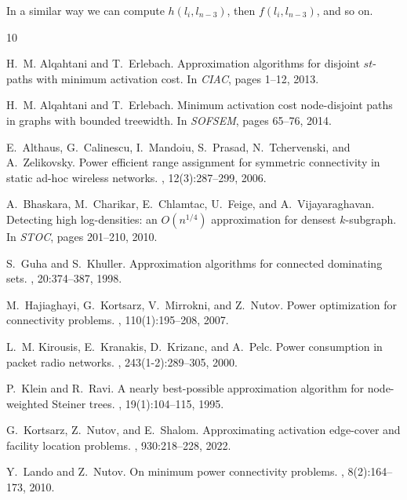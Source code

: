 \documentclass[a4paper,UKenglish,autoref]{lipics-v2019}
\begin{document}
In a similar way we can compute $h(l_i, l_{n-3})$, then $f(l_i,l_{n-3})$, and so on. 

% 

\begin{thebibliography}{10}

H.~M. Alqahtani and T.~Erlebach.
\newblock Approximation algorithms for disjoint $st$-paths with minimum
  activation cost.
\newblock In {\em CIAC}, pages 1--12, 2013.

H.~M. Alqahtani and T.~Erlebach.
\newblock Minimum activation cost node-disjoint paths in graphs with bounded
  treewidth.
\newblock In {\em SOFSEM}, pages 65--76, 2014.

E.~Althaus, G.~Calinescu, I.~Mandoiu, S.~Prasad, N.~Tchervenski, and
  A.~Zelikovsky.
\newblock Power efficient range assignment for symmetric connectivity in static
  ad-hoc wireless networks.
, 12(3):287--299, 2006.

A.~Bhaskara, M.~Charikar, E.~Chlamtac, U.~Feige, and A.~Vijayaraghavan.
\newblock Detecting high log-densities: an {$O(n^{1/4})$} approximation for
  densest $k$-subgraph.
\newblock In {\em STOC}, pages 201--210, 2010.

S.~Guha and S.~Khuller.
\newblock Approximation algorithms for connected dominating sets.
, 20:374--387, 1998.

M.~Hajiaghayi, G.~Kortsarz, V.~Mirrokni, and Z.~Nutov.
\newblock Power optimization for connectivity problems.
, 110(1):195--208, 2007.

L.~M. Kirousis, E.~Kranakis, D.~Krizanc, and A.~Pelc.
\newblock Power consumption in packet radio networks.
, 243(1-2):289--305, 2000.

P.~Klein and R.~Ravi.
\newblock A nearly best-possible approximation algorithm for node-weighted
  {Steiner} trees.
, 19(1):104--115, 1995.

G.~Kortsarz, Z.~Nutov, and E.~Shalom.
\newblock Approximating activation edge-cover and facility location problems.
, 930:218--228, 2022.

Y.~Lando and Z.~Nutov.
\newblock On minimum power connectivity problems.
, 8(2):164--173, 2010.


\end{thebibliography}
\end{document}
